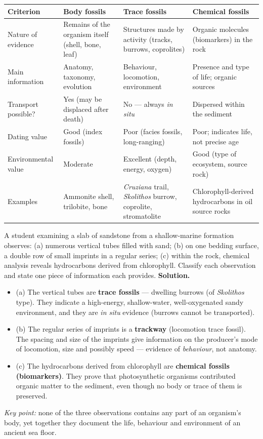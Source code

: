 \documentclass[11pt]{article}
\begin{document}
\begin{center}
\begin{tabularx}{\linewidth}{|l|X|X|X|}
\hline
\rowcolor{popblueL} \textbf{Criterion} & \textbf{Body fossils} & \textbf{Trace fossils} & \textbf{Chemical fossils} \\
\hline
Nature of evidence & Remains of the organism itself (shell, bone, leaf) & Structures made by activity (tracks, burrows, coprolites) & Organic molecules (biomarkers) in the rock \\
\hline
Main information & Anatomy, taxonomy, evolution & Behaviour, locomotion, environment & Presence and type of life; organic sources \\
\hline
Transport possible? & Yes (may be displaced after death) & No --- always \emph{in situ} & Dispersed within the sediment \\
\hline
Dating value & Good (index fossils) & Poor (facies fossils, long-ranging) & Poor; indicates life, not precise age \\
\hline
Environmental value & Moderate & Excellent (depth, energy, oxygen) & Good (type of ecosystem, source rock) \\
\hline
Examples & Ammonite shell, trilobite, bone & \emph{Cruziana} trail, \emph{Skolithos} burrow, coprolite, stromatolite & Chlorophyll-derived hydrocarbons in oil source rocks \\
\hline
\end{tabularx}
\end{center}

\begin{exoresolu}
A student examining a slab of sandstone from a shallow-marine formation observes: (a) numerous vertical tubes filled with sand; (b) on one bedding surface, a double row of small imprints in a regular series; (c) within the rock, chemical analysis reveals hydrocarbons derived from chlorophyll. Classify each observation and state one piece of information each provides.
\tcblower
\textbf{Solution.}
\begin{itemize}
  \item (a) The vertical tubes are \textbf{trace fossils} --- dwelling burrows (of \emph{Skolithos} type). They indicate a high-energy, shallow-water, well-oxygenated sandy environment, and they are \emph{in situ} evidence (burrows cannot be transported).
  \item (b) The regular series of imprints is a \textbf{trackway} (locomotion trace fossil). The spacing and size of the imprints give information on the producer's mode of locomotion, size and possibly speed --- evidence of \emph{behaviour}, not anatomy.
  \item (c) The hydrocarbons derived from chlorophyll are \textbf{chemical fossils (biomarkers)}. They prove that photosynthetic organisms contributed organic matter to the sediment, even though no body or trace of them is preserved.
\end{itemize}
\emph{Key point:} none of the three observations contains any part of an organism's body, yet together they document the life, behaviour and environment of an ancient sea floor.
\end{exoresolu}
\end{document}

